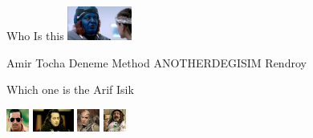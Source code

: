 \documentclass{exam}
\begin{document}
\begin{questions}
\question Who Is this\newline
\includegraphics[height=3em]{rendroy2.jpg} \newline
\begin{oneparchoices}
\choice Amir Tocha
\choice Deneme Method
\choice ANOTHERDEGISIM
\choice Rendroy
\end{oneparchoices}
\question Which one is the Arif Isik\newline
\begin{oneparchoices}
\choice \includegraphics[height=2em]{arifisik.jpg}
\choice \includegraphics[height=2em]{komutanlogar.jpeg}
\choice \includegraphics[height=2em]{216.jpg}
\choice \includegraphics[height=2em]{faruk.jpg}
\end{oneparchoices}
\end{questions}
\end{document}
